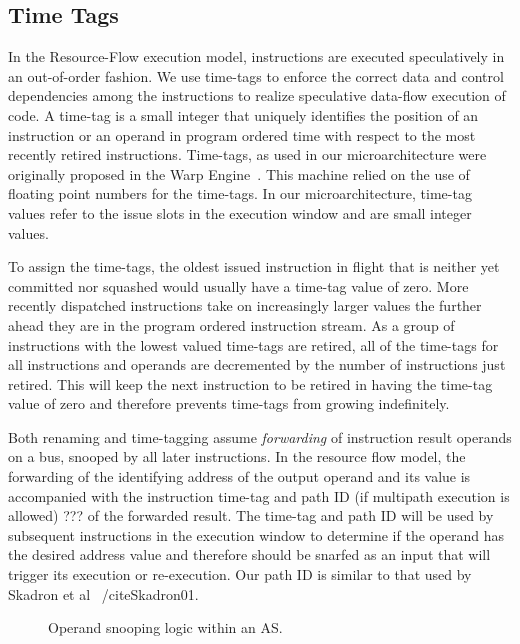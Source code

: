 \documentclass[10pt,twocolumn]{IEEEtran}
\begin{document}
\subsection{Time Tags}

In the Resource-Flow execution model, instructions are executed
speculatively in an out-of-order fashion.  We use time-tags to enforce
the correct data and control dependencies among the instructions to
realize speculative data-flow execution of code.  A time-tag is a small
integer that uniquely identifies the position of an instruction or an
operand in program ordered time with respect to the most recently
retired instructions.  
%
%
Time-tags, as
used in our microarchitecture were originally proposed in the Warp
Engine~\cite{Cleary95}.  
This machine relied on the use of floating point numbers
for the time-tags.  In our microarchitecture, time-tag values refer to
the issue slots in the execution window and are small integer values.

To assign the time-tags, the oldest issued instruction in flight that
is neither yet committed nor squashed would usually have a time-tag
value of zero.  More recently dispatched instructions take on
increasingly larger values the further ahead they are in the program
ordered instruction stream.  As a group of instructions with the lowest
valued time-tags are retired, all of the time-tags for all instructions
and operands are decremented by the number of instructions just
retired.  This will keep the next instruction to be retired in having
the time-tag value of zero and therefore prevents time-tags from
growing indefinitely.

Both renaming and time-tagging assume \emph{forwarding} of instruction
result operands on a bus, snooped by all later instructions.  In the
resource flow model, the forwarding of the identifying address of the
output operand and its value is accompanied with the instruction
time-tag and path ID (if multipath execution is allowed) ??? of the
forwarded result.  The time-tag and path ID will be used by subsequent
instructions in the execution window to determine if the operand has
the desired address value and therefore should be snarfed as an input
that will trigger its execution or re-execution.
Our path ID is similar to that used by Skadron et al ~/cite{Skadron01}.

\begin{figure}
{}
\caption{Operand snooping logic within an AS.}
\label{fig:source}
\end{figure}  
 
\end{document}
